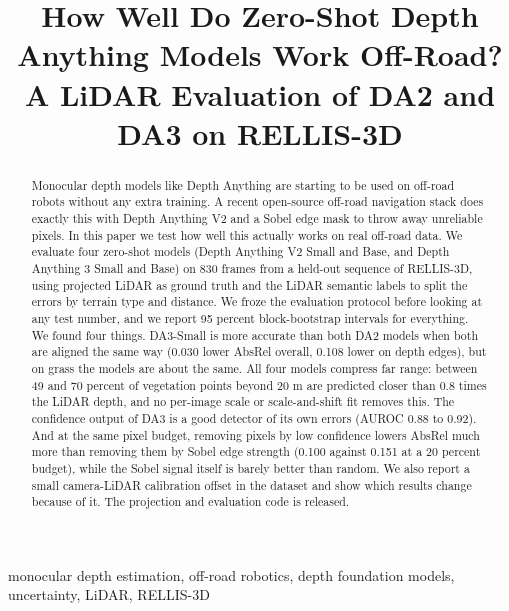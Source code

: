 \documentclass[conference]{IEEEtran}
\begin{document}
\title{How Well Do Zero-Shot Depth Anything Models Work Off-Road? A LiDAR Evaluation of DA2 and DA3 on RELLIS-3D}

\author{
}

\maketitle

\begin{abstract}
Monocular depth models like Depth Anything are starting to be used on off-road robots without any extra training. A recent open-source off-road navigation stack does exactly this with Depth Anything V2 and a Sobel edge mask to throw away unreliable pixels. In this paper we test how well this actually works on real off-road data. We evaluate four zero-shot models (Depth Anything V2 Small and Base, and Depth Anything 3 Small and Base) on 830 frames from a held-out sequence of RELLIS-3D, using projected LiDAR as ground truth and the LiDAR semantic labels to split the errors by terrain type and distance. We froze the evaluation protocol before looking at any test number, and we report 95 percent block-bootstrap intervals for everything. We found four things. DA3-Small is more accurate than both DA2 models when both are aligned the same way (0.030 lower AbsRel overall, 0.108 lower on depth edges), but on grass the models are about the same. All four models compress far range: between 49 and 70 percent of vegetation points beyond 20 m are predicted closer than 0.8 times the LiDAR depth, and no per-image scale or scale-and-shift fit removes this. The confidence output of DA3 is a good detector of its own errors (AUROC 0.88 to 0.92). And at the same pixel budget, removing pixels by low confidence lowers AbsRel much more than removing them by Sobel edge strength (0.100 against 0.151 at a 20 percent budget), while the Sobel signal itself is barely better than random. We also report a small camera-LiDAR calibration offset in the dataset and show which results change because of it. The projection and evaluation code is released.
\end{abstract}

\begin{IEEEkeywords}
monocular depth estimation, off-road robotics, depth foundation models, uncertainty, LiDAR, RELLIS-3D
\end{IEEEkeywords}
\end{document}
